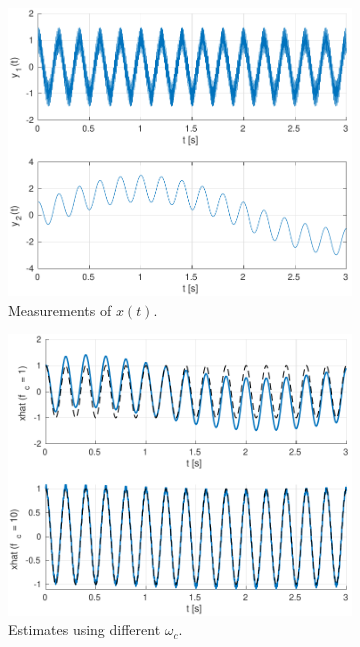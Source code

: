 \documentclass[a4paper]{article}
\begin{document}
\begin{figure}[h]
  \centering
  \begin{subfigure}[t]{0.32\textwidth}
    \includegraphics[width=\textwidth]{scf_meas.pdf}
    \caption{Measurements of $x(t)$.}
  \end{subfigure}
  \begin{subfigure}[t]{0.32\textwidth}
    \includegraphics[width=\textwidth]{scf_est.pdf}
    \caption{Estimates using different $\omega_c$.}
  \end{subfigure}
  \begin{subfigure}[t]{0.32\textwidth}

\end{subfigure}
\end{figure}
\end{document}
